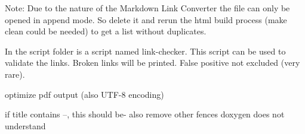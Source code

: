 \begin{DoxyCode}{0}
\end{DoxyCode}


Note\+: Due to the nature of the Markdown Link Converter the file can only be opened in append mode. So delete it and rerun the html build process ({\ttfamily make clean} could be needed) to get a list without duplicates.

In the script folder is a script named {\ttfamily link-\/checker}. This script can be used to validate the links. Broken links will be printed. False positive not excluded (very rare).


\begin{DoxyItemize}
\item optimize pdf output (also U\+T\+F-\/8 encoding)
\item if title contains --, this should be-\/ also remove other fences doxygen does not understand 
\end{DoxyItemize}